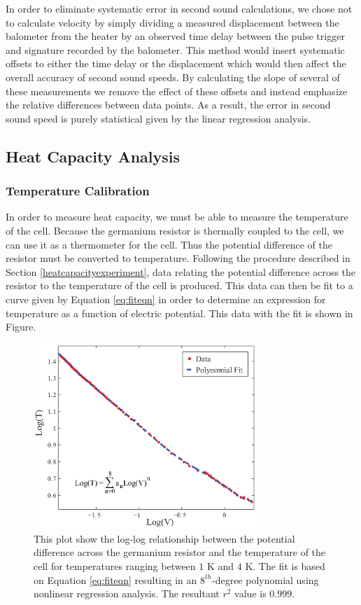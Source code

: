 In order to eliminate systematic error in second sound calculations, we chose not to calculate velocity by simply dividing a measured displacement between the balometer from the heater by an observed time delay between the pulse trigger and signature recorded by the balometer. This method would insert systematic offsets to either the time delay or the displacement which would then affect the overall accuracy of second sound speeds.  By calculating the slope of several of these measurements we remove the effect of these offsets and instead emphasize the relative differences between data points.  As a result, the error in second sound speed is purely statistical given by the linear regression analysis.  

\subsection{Heat Capacity Analysis}\label{heatcapacityanalysis}
\subsubsection{Temperature Calibration}\label{temperaturecalibration}

In order to measure heat capacity, we must be able to measure the temperature of the cell.  Because the germanium resistor is thermally coupled to the cell, we can use it as a thermometer for the cell.  Thus the potential difference of the resistor must be converted to temperature.  Following the procedure described in Section \ref{heatcapacityexperiment}, data relating the potential difference across the resistor to the temperature of the cell is produced.  This data can then be fit to a curve given by Equation \ref{eq:fiteqn} in order to determine an expression for temperature as a function of electric potential.  This data with the fit is shown in Figure.  

\begin{figure}[htbp]
\begin{center}
\includegraphics[height=70mm]{./figures/polyfit.eps}
\caption{\small{This plot show the log-log relationship between the potential difference across the germanium resistor and the temperature of the cell for temperatures ranging between $1$ K and $4$ K.  The fit is based on Equation \ref{eq:fiteqn} resulting in an $8^{th}$-degree polynomial using nonlinear regression analysis.  The resultant $r^{2}$ value is $0.999$.}}
\label{fig:polyfit}
\end{center}
\end{figure}


